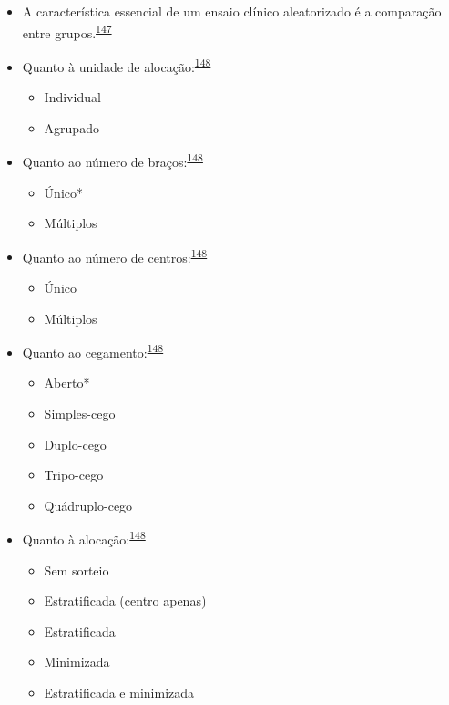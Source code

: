\documentclass[
  a4paper,
]{book}
\begin{document}
\begin{itemize}
\item
  A característica essencial de um ensaio clínico aleatorizado é a comparação entre grupos.\textsuperscript{\protect\hyperlink{ref-bland2011}{147}}
\item
  Quanto à unidade de alocação:\textsuperscript{\protect\hyperlink{ref-Bruce2022}{148}}

  \begin{itemize}
  \item
    Individual
  \item
    Agrupado
  \end{itemize}
\item
  Quanto ao número de braços:\textsuperscript{\protect\hyperlink{ref-Bruce2022}{148}}

  \begin{itemize}
  \item
    Único*
  \item
    Múltiplos
  \end{itemize}
\item
  Quanto ao número de centros:\textsuperscript{\protect\hyperlink{ref-Bruce2022}{148}}

  \begin{itemize}
  \item
    Único
  \item
    Múltiplos
  \end{itemize}
\item
  Quanto ao cegamento:\textsuperscript{\protect\hyperlink{ref-Bruce2022}{148}}

  \begin{itemize}
  \item
    Aberto*
  \item
    Simples-cego
  \item
    Duplo-cego
  \item
    Tripo-cego
  \item
    Quádruplo-cego
  \end{itemize}
\item
  Quanto à alocação:\textsuperscript{\protect\hyperlink{ref-Bruce2022}{148}}

  \begin{itemize}
  \item
    Sem sorteio
  \item
    Estratificada (centro apenas)
  \item
    Estratificada
  \item
    Minimizada
  \item
    Estratificada e minimizada
  \end{itemize}
\end{itemize}
\end{document}
